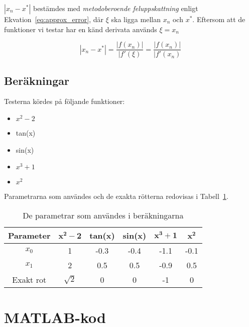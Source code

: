 \documentclass[a4paper,titlepage]{article}
\begin{document}
$|x_n - x^*|$ bestämdes med \textit{metodoberoende feluppskattning} enligt 
Ekvation~\ref{eq:approx_error}, där $\xi$ ska ligga mellan $x_n$ och $x^*$. Eftersom
att de funktioner vi testar har en känd derivata används $\xi = x_n$

\begin{equation}
    |x_n - x^*| = \frac{|f(x_n)|}{|f'(\xi)} = \frac{|f(x_n)|}{|f'(x_n)}
    \label{eq:approx_error}
\end{equation}


\subsection{Beräkningar}

Testerna kördes på följande funktioner:

\begin{itemize}
    \item $x^2 - 2$
    \item tan(x)
    \item sin(x)
    \item $x^3 + 1$
    \item $x^2$
\end{itemize}

Parametrarna som användes och de exakta rötterna redovisas i Tabell~\ref{tab:params}.

\begin{table}[h]
    \centering
    \begin{tabular}{c | c | c | c | c | c}
        \textbf{Parameter}  & $\mathbf{x^2 - 2}$    & \textbf{tan(x)}   & \textbf{sin(x)}   & $\mathbf{x^3 + 1}$ & $\mathbf{x^2}$ \\ \hline
        $x_0$               & 1                     & -0.3                & -0.4                   & -1.1 & -0.1 \\
        $x_1$               & 2                     & 0.5                 & 0.5                  & -0.9 & 0.5 \\
        Exakt rot           & $\sqrt{2} $           & 0                  & 0                  & -1 & 0 \\
        
    \end{tabular}
    \caption{De parametrar som användes i beräkningarna}
\label{tab:params}
\end{table}


\section{MATLAB-kod}
\end{document}
